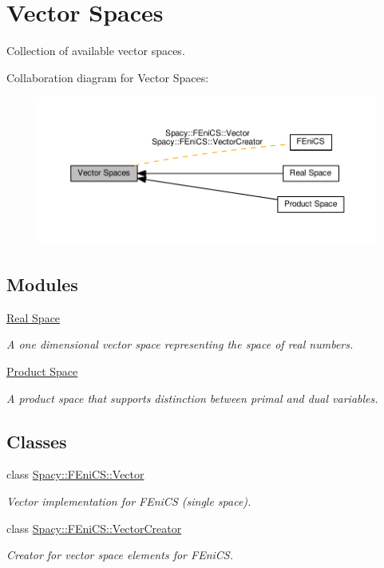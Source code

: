 \hypertarget{group__VectorSpaceGroup}{}\section{Vector Spaces}
\label{group__VectorSpaceGroup}


Collection of available vector spaces.  


Collaboration diagram for Vector Spaces\+:\nopagebreak
\begin{figure}[H]
\begin{center}
\leavevmode
\includegraphics[width=350pt]{group__VectorSpaceGroup}
\end{center}
\end{figure}
\subsection*{Modules}
\begin{DoxyCompactItemize}
\item 
\hyperlink{group__RealGroup}{Real Space}
\begin{DoxyCompactList}\small\item\em A one dimensional vector space representing the space of real numbers. \end{DoxyCompactList}\item 
\hyperlink{group__ProductSpaceGroup}{Product Space}
\begin{DoxyCompactList}\small\item\em A product space that supports distinction between primal and dual variables. \end{DoxyCompactList}\end{DoxyCompactItemize}
\subsection*{Classes}
\begin{DoxyCompactItemize}
\item 
class \hyperlink{classSpacy_1_1FEniCS_1_1Vector}{Spacy\+::\+F\+Eni\+C\+S\+::\+Vector}
\begin{DoxyCompactList}\small\item\em Vector implementation for F\+Eni\+C\+S (single space). \end{DoxyCompactList}\item 
class \hyperlink{classSpacy_1_1FEniCS_1_1VectorCreator}{Spacy\+::\+F\+Eni\+C\+S\+::\+Vector\+Creator}
\begin{DoxyCompactList}\small\item\em Creator for vector space elements for F\+Eni\+C\+S. \end{DoxyCompactList}\end{DoxyCompactItemize}
